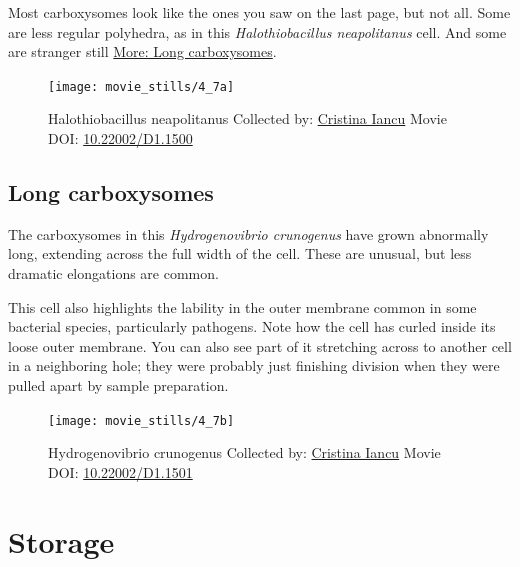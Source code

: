 \documentclass[]{tufte-book}
\begin{document}
Most carboxysomes look like the ones you saw on the last page, but not
all. Some are less regular polyhedra, as in this \emph{Halothiobacillus
neapolitanus} cell. And some are stranger still
\protect\hyperlink{Long_carboxysomes}{More: Long carboxysomes}.





\begin{figure}
\texttt{[image: movie\_stills/4\_7a]} \caption[Halothiobacillus neapolitanus Collected by:
\protect\hyperlink{cristina_iancu}{Cristina Iancu} Movie DOI:
\href{https://doi.org/10.22002/D1.1500}{10.22002/D1.1500}]{Halothiobacillus neapolitanus Collected by:
\protect\hyperlink{cristina_iancu}{Cristina Iancu} Movie DOI:
\href{https://doi.org/10.22002/D1.1500}{10.22002/D1.1500}}\label{fig:4-7a}
\end{figure}

\hypertarget{Long_carboxysomes}{\subsection{Long
carboxysomes}\label{Long_carboxysomes}}

The carboxysomes in this \emph{Hydrogenovibrio crunogenus} have grown
abnormally long, extending across the full width of the cell. These are
unusual, but less dramatic elongations are common.

This cell also highlights the lability in the outer membrane common in
some bacterial species, particularly pathogens. Note how the cell has
curled inside its loose outer membrane. You can also see part of it
stretching across to another cell in a neighboring hole; they were
probably just finishing division when they were pulled apart by sample
preparation.





\begin{figure}
\texttt{[image: movie\_stills/4\_7b]} \caption[Hydrogenovibrio crunogenus Collected by:
\protect\hyperlink{cristina_iancu}{Cristina Iancu} Movie DOI:
\href{https://doi.org/10.22002/D1.1501}{10.22002/D1.1501}]{Hydrogenovibrio crunogenus Collected by:
\protect\hyperlink{cristina_iancu}{Cristina Iancu} Movie DOI:
\href{https://doi.org/10.22002/D1.1501}{10.22002/D1.1501}}\label{fig:4-7b}
\end{figure}

\section{Storage}\label{storage}
\end{document}
